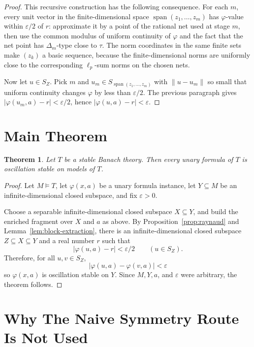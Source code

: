 \documentclass[11pt]{article}
\newtheorem{theorem}{Theorem}
\newcommand{\eps}{\varepsilon}
\newcommand{\Span}{\operatorname{span}}
\begin{document}
\begin{proof}
This recursive construction has the following consequence. For each \(m\),
every unit vector in the finite-dimensional space
\(\Span(z_1,\ldots,z_m)\) has \(\varphi\)-value within \(\eps/2\) of \(r\):
approximate it by a point of the rational net used at stage \(m\), then use
the common modulus of uniform continuity of \(\varphi\) and the fact that the
net point has \(\Delta_m\)-type close to \(\tau\). The norm coordinates in
the same finite sets make \((z_k)\) a basic sequence, because the
finite-dimensional norms are uniformly close to the corresponding
\(\ell_p\)-sum norms on the chosen nets.

Now let \(u\in S_Z\). Pick \(m\) and
\(u_m\in S_{\Span(z_1,\ldots,z_m)}\) with \(\|u-u_m\|\) so small that
uniform continuity changes \(\varphi\) by less than \(\eps/2\). The previous
paragraph gives \(|\varphi(u_m,a)-r|<\eps/2\), hence
\(|\varphi(u,a)-r|<\eps\).
\end{proof}

\section*{Main Theorem}

\begin{theorem}\label{thm:main}
Let \(T\) be a stable Banach theory. Then every unary formula of \(T\) is
oscillation stable on models of \(T\).
\end{theorem}

\begin{proof}
Let \(M\models T\), let \(\varphi(x,a)\) be a unary formula instance, let
\(Y\subseteq M\) be an infinite-dimensional closed subspace, and fix
\(\eps>0\).

Choose a separable infinite-dimensional closed subspace \(X\subseteq Y\), and
build the enriched fragment over \(X\) and \(a\) as above. By
Proposition~\ref{prop:raynaud} and Lemma~\ref{lem:block-extraction}, there is
an infinite-dimensional closed subspace \(Z\subseteq X\subseteq Y\) and a
real number \(r\) such that
\[
  |\varphi(u,a)-r|<\eps/2
  \qquad (u\in S_Z).
\]
Therefore, for all \(u,v\in S_Z\),
\[
  |\varphi(u,a)-\varphi(v,a)|<\eps
\]
so \(\varphi(x,a)\) is oscillation stable on \(Y\). Since \(M,Y,a\), and
\(\eps\) were arbitrary, the theorem follows.
\end{proof}

\section*{Why The Naive Symmetry Route Is Not Used}
\end{document}
